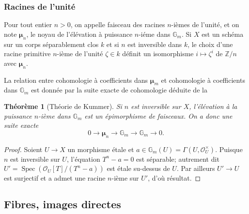 \documentclass{book}
\DeclareMathOperator{\spec}{Spec}
\newcommand{\cO}{\mathcal{O}}
\newcommand{\dG}{\mathbb{G}}
\newcommand{\dmu}{{\bm\mu}}%
\newcommand{\dZ}{\mathbb{Z}}
\newtheorem{theorem}[subsubsection]{Théorème}
\begin{document}
\subsubsection{Racines de l'unité}\label{I:2-2-4}

Pour tout entier $n>0$, on appelle faisceau des racines $n$-ièmes de 
l'unité, et on note $\dmu_n$, le noyau de l'élévation à puissance 
$n$-iéme dans $\dG_m$. Si $X$ est un schéma sur un corps séparablement 
clos $k$ et si $n$ est inversible dans $k$, le choix d'une racine primitive 
$n$-ième de l'unité $\zeta\in k$ définit un isomorphisme 
$i\mapsto \zeta^i$ de $\dZ/n$ avec $\dmu_n$. 

La relation entre cohomologie à coefficients dans $\dmu_m$ et cohomologie à 
coefficients dans $\dG_m$ est donnée par la suite exacte de cohomologie déduite 
de la 






\begin{theorem}[Théorie de Kummer]\label{I:2-2-5}
Si $n$ est inversible sur $X$, l'élévation à la puissance $n$-ième dans 
$\dG_m$ est un épimorphisme de faisceaux. On a donc une suite exacte 
\[
  0 \to \dmu_n \to \dG_m \to \dG_m \to 0\text{.}
\]
\end{theorem}
\begin{proof}
Soient $U\to X$ un morphisme étale et $a\in \dG_m(U) =\Gamma(U,\cO_U^\times)$. 
Puisque $n$ est inversible sur $U$, l'équation $T^n-a = 0$ est séparable; 
autrement dit $U'=\spec\left(\cO_U[T]/(T^n-a)\right)$ est étale su-dessus de 
$U$. Par ailleurs $U'\to U$ est surjectif et a admet une racine $n$-ième sur 
$U'$, d'où résultat. 
\end{proof}










\subsection{Fibres, images directes}\label{I:2-3}





\subsubsection{}\label{I:2-3-1}
\end{document}
